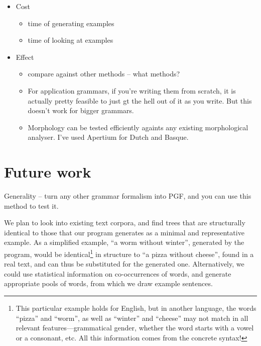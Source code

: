 \documentclass[11pt]{article}
\begin{document}
\begin{itemize}
\item Cost
  \begin{itemize}
  \item time of generating examples
  \item time of looking at examples
  \end{itemize}

\item Effect
  \begin{itemize}
  \item compare against other methods -- what methods?
  \item For application grammars, if you're writing them from scratch, it is actually pretty feasible to just gt the hell out of it as you write. But this doesn't work for bigger grammars.
  \item Morphology can be tested efficiently againts any existing morphological analyser. I've used Apertium for Dutch and Basque.
  \end{itemize}
\end{itemize}


\section{Future work}


Generality -- turn any other grammar formalism into PGF, and you can use this method to test it.


We plan to look into existing text corpora, and find trees that are
structurally identical  to those that our program generates as a
minimal and representative example. As a simplified example, ``a worm
without winter'', generated by the program, would be identical\footnote{This particular example holds for English, but in another language, the words ``pizza'' and ``worm'', as well as ``winter'' and ``cheese'' may not match in all relevant features---grammatical gender, whether the word starts with a vowel or a consonant, etc. All this information comes from the concrete syntax!} 
in structure to ``a pizza without cheese'', found in a real text, and
can thus be substituted for the generated one.   
Alternatively, we could use statistical information on co-occurrences
of words, and generate appropriate pools of words, from which we draw
example sentences. 

%
%
\end{document}
